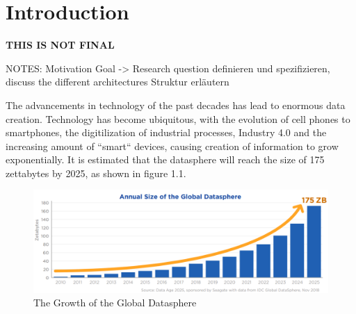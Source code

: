 \chapter{Introduction}
\label{cha:Introduction} %
\textbf{\color{red}THIS IS NOT FINAL}

NOTES:
Motivation
Goal -> Research question definieren und spezifizieren, discuss the different architectures
Struktur erläutern

The advancements in technology of the past decades has lead to enormous data creation. Technology has become ubiquitous, 
with the evolution of cell phones to smartphones, the digitilization of industrial processes, Industry 4.0
and the increasing amount of ``smart`` devices, causing creation of information to grow exponentially.
It is estimated that the \gls{datasphere} will reach the size of 175 zettabytes by 2025, as shown in figure 1.1.
\begin{figure}[ht]
\centering
\includegraphics[width=1.0\textwidth]{Bilder/size_global_datasphere.png}
\caption{The Growth of the Global Datasphere \cite[p.6]{idc-seagate-data}}
\label{fig:growth_datasphere}
\end{figure}

